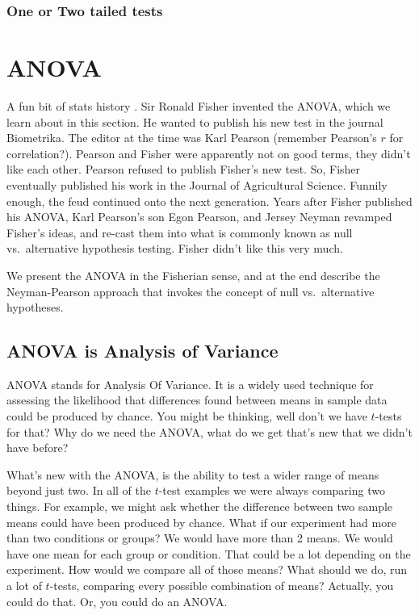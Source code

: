\documentclass[
]{book}
\begin{document}
\hypertarget{one-or-two-tailed-tests}{%
\subsection{One or Two tailed tests}\label{one-or-two-tailed-tests}}

\hypertarget{anova}{%
\chapter{ANOVA}\label{anova}}

A fun bit of stats history \citep{salsburg2001lady}. Sir Ronald Fisher invented the ANOVA, which we learn about in this section. He wanted to publish his new test in the journal Biometrika. The editor at the time was Karl Pearson (remember Pearson's \(r\) for correlation?). Pearson and Fisher were apparently not on good terms, they didn't like each other. Pearson refused to publish Fisher's new test. So, Fisher eventually published his work in the Journal of Agricultural Science. Funnily enough, the feud continued onto the next generation. Years after Fisher published his ANOVA, Karl Pearson's son Egon Pearson, and Jersey Neyman revamped Fisher's ideas, and re-cast them into what is commonly known as null vs.~alternative hypothesis testing. Fisher didn't like this very much.

We present the ANOVA in the Fisherian sense, and at the end describe the Neyman-Pearson approach that invokes the concept of null vs.~alternative hypotheses.

\hypertarget{anova-is-analysis-of-variance}{%
\section{ANOVA is Analysis of Variance}\label{anova-is-analysis-of-variance}}

ANOVA stands for Analysis Of Variance. It is a widely used technique for assessing the likelihood that differences found between means in sample data could be produced by chance. You might be thinking, well don't we have \(t\)-tests for that? Why do we need the ANOVA, what do we get that's new that we didn't have before?

What's new with the ANOVA, is the ability to test a wider range of means beyond just two. In all of the \(t\)-test examples we were always comparing two things. For example, we might ask whether the difference between two sample means could have been produced by chance. What if our experiment had more than two conditions or groups? We would have more than 2 means. We would have one mean for each group or condition. That could be a lot depending on the experiment. How would we compare all of those means? What should we do, run a lot of \(t\)-tests, comparing every possible combination of means? Actually, you could do that. Or, you could do an ANOVA.
\end{document}
